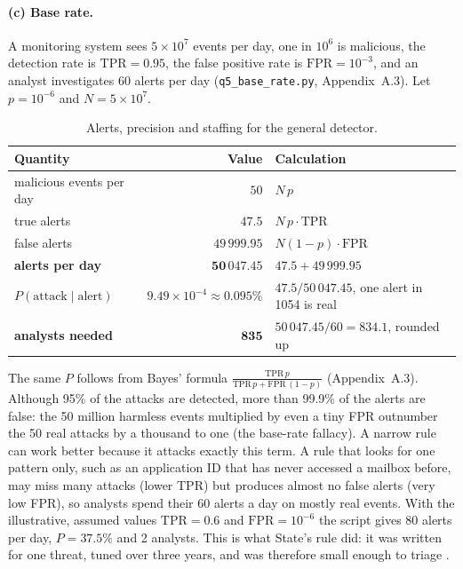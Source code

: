 \documentclass[11pt,a4paper]{article}
\newcommand{\code}[1]{\texttt{#1}}
\begin{document}
\paragraph{(c) Base rate.} A monitoring system sees $5\times10^{7}$ events per day, one in $10^{6}$ is malicious, the detection
rate is $\mathrm{TPR}=0.95$, the false positive rate is $\mathrm{FPR}=10^{-3}$, and an analyst investigates 60 alerts per day
(\code{q5\_base\_rate.py}, Appendix~A.3). Let $p=10^{-6}$ and $N=5\times10^{7}$.
\begin{table}[H]
\centering\small
\begin{tabular}{@{}lrl@{}}
\toprule
Quantity & Value & Calculation \\
\midrule
malicious events per day & $50$ & $N\,p$ \\
true alerts & $47.5$ & $N\,p\cdot\mathrm{TPR}$ \\
false alerts & $49\,999.95$ & $N(1-p)\cdot\mathrm{FPR}$ \\
\textbf{alerts per day} & $\mathbf{50\,047.45}$ & $47.5+49\,999.95$ \\
$P(\text{attack}\mid\text{alert})$ & $9.49\times10^{-4}\approx0.095\%$ & $47.5/50\,047.45$, one alert in 1054 is real \\
\textbf{analysts needed} & $\mathbf{835}$ & $50\,047.45/60=834.1$, rounded up \\
\bottomrule
\end{tabular}
\caption{Alerts, precision and staffing for the general detector.}
\end{table}
The same $P$ follows from Bayes' formula $\frac{\mathrm{TPR}\,p}{\mathrm{TPR}\,p+\mathrm{FPR}\,(1-p)}$ (Appendix~A.3). Although 95\% of the attacks are
detected, more than 99.9\% of the alerts are false: the 50 million harmless events multiplied by even a tiny FPR outnumber the
50 real attacks by a thousand to one (the base-rate fallacy). A narrow rule can work better because it attacks exactly this
term. A rule that looks for one pattern only, such as an application ID that has never accessed a mailbox before, may miss many
attacks (lower TPR) but produces almost no false alerts (very low FPR), so analysts spend their 60 alerts a day on mostly real
events. With the illustrative, assumed values $\mathrm{TPR}=0.6$ and $\mathrm{FPR}=10^{-6}$ the script gives 80 alerts per day,
$P=37.5\%$ and 2 analysts. This is what State's rule did: it was written for one threat, tuned over three years, and was
therefore small enough to triage \cite{csrb}.

\end{document}
